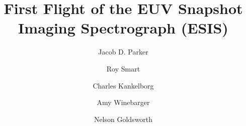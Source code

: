 \renewcommand\arcmin{\mbox{$^\prime$}}
\renewcommand\arcsec{\mbox{$^{\prime\prime}$}}

\newcommand{\rts}[1]{{\color{violet} RTS: #1}} %
\newcommand{\jdp}[1]{{\color{red} JDP: #1}} %
\newcommand{\cck}[1]{{\color{brown} CCK: #1}} %
\newcommand{\amy}[1]{{\color{cyan} ARW: #1}}

\newcommand{\spectralline}[3]{#1\,{\textsc{#2}}\ #3\,\AA } %
\newcommand{\ov}{\spectralline{O}{v}{629.7}}
\newcommand{\oiii}{\spectralline{O}{iii}{599.6}}
\newcommand{\oiv}{\spectralline{O}{iv}{608.4}}
\newcommand{\oivTwo}{\spectralline{O}{iv}{609.83}}
\newcommand{\mgxbright}{\spectralline{Mg}{x}{609.79}}
\newcommand{\mgxdim}{\spectralline{Mg}{x}{624.9}}
\newcommand{\hei}{\spectralline{He}{i}{584.3}}
\newcommand{\heii}{\spectralline{He}{ii}{304}}
\newcommand{\siiv}{\spectralline{Si}{iv}{1394}}

\newcommand{\esispointing}{[18\arcsec, -19\arcsec]}
\newcommand{\esisroll}{\ensuremath{0.85^{\circ}}}
\newcommand{\esisfov}{11.5\arcmin}
\newcommand{\aianearapogee}{18:08:17\,UTC}






\title{First Flight of the EUV Snapshot Imaging Spectrograph (ESIS)}

\author[0000-0001-8732-8284]{Jacob D. Parker}
\author[0000-0002-9997-5515]{Roy Smart}
\author[0000-0002-1992-7469]{Charles Kankelborg}
\author[0000-0002-5608-531X]{Amy Winebarger}
\author[0000-0002-6787-0380]{Nelson Goldsworth}

